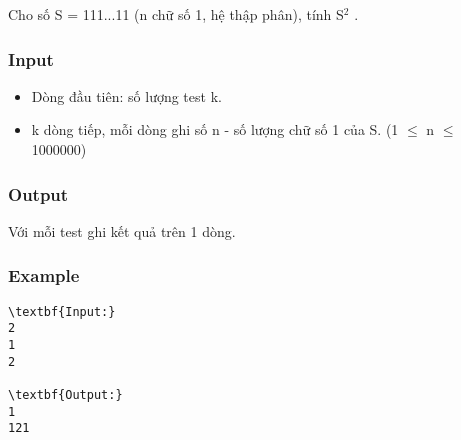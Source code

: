 

Cho số S = 111...11 (n chữ số 1, hệ thập phân), tính S$^2 $ .

\subsubsection{Input}
\begin{itemize}
	\item Dòng đầu tiên: số lượng test k.
	\item k dòng tiếp, mỗi dòng ghi số n - số lượng chữ số 1 của S. (1  $\le$  n  $\le$  1000000)
\end{itemize}

\subsubsection{Output}

Với mỗi test ghi kết quả trên 1 dòng.

\subsubsection{Example}
\begin{verbatim}
\textbf{Input:}
2
1
2

\textbf{Output:}
1
121
\end{verbatim}

